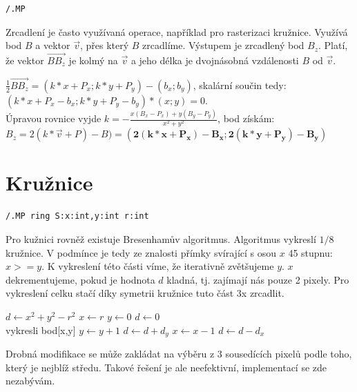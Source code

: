 \documentclass[a4paper,12pt]{book}
\begin{document}
\begin{lstlisting}
/.MP
\end{lstlisting}

Zrcadlení je často využívaná operace, například pro rasterizaci kružnice.
Využívá bod $B$ a vektor $\vec{v}$, přes který $B$ zrcadlíme. Výstupem je zrcadlený bod $B_{z}$.
Platí, že vektor $\overrightarrow{BB_{z}}$ je kolmý na $\vec{v}$ a jeho délka je dvojnásobná vzdálenosti $B$ od $\vec{v}$.


$\frac{1}{2} \overrightarrow{BB_{z}} = (k*x+P_x;k*y+P_y)-(b_x;b_y)$, skalární součin tedy:
\\$(k*x+P_x-b_x;k*y+P_y-b_y)*(x;y)=0$.
\\Úpravou rovnice vyjde $k = -\frac{x(B_x-P_x)+y(B_y-P_y)}{x^2+y^2}$, bod získám:
$B_z = 2(k*\vec{v}+P)-B) = \bm{(2(k*x+P_x)-B_x;2(k*y+P_y)-B_y)}$







\section{Kružnice} %


\begin{lstlisting}
/.MP ring S:x:int,y:int r:int
\end{lstlisting}

Pro kužnici rovněž existuje Bresenhamův algoritmus. Algoritmus vykreslí $1/8$ kružnice. V podmínce je tedy ze znalosti přímky svírající s osou $x$ 45 stupnu: $x>=y$. K vykreslení této části víme, že iterativně zvětšujeme $y$. $x$ dekrementujeme, pokud je hodnota $d$ kladná, tj. zajímají nás pouze 2 pixely. %
Pro vykreslení celku stačí díky symetrii kružnice tuto část 3x zrcadlit.




\begin{algorithmic}
\State $d \gets x^2 + y^2 - r^2$
\State $x \gets r$
\State $y \gets 0$
\State $d \gets 0$
\\vykresli bod[x,y]
\State $y \gets y + 1$
\State $d \gets d + d_y$
    \State $x \gets x - 1$
    \State $d \gets d - d_x$
\EndIf 
\EndWhile
\end{algorithmic}

Drobná modifikace se může zakládat na výběru z 3 sousedících pixelů podle toho, který je nejblíž středu. Takové řešení je ale neefektivní, implementací se zde nezabývám.
\end{document}
